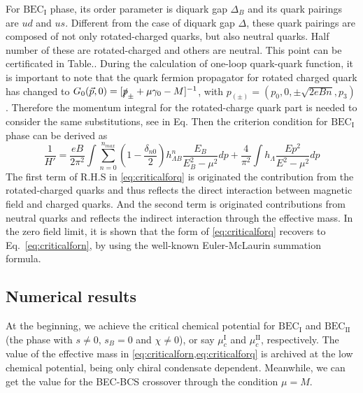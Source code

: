 \documentclass[prd, showpacs,nofootinbib,amsmath,amssymb]{revtex4}
\begin{document}
For  $\text{BEC}_\text{I}$ phase, its order parameter is diquark gap $\Delta_B$ and its quark pairings are
$ud$ and $us$.
Different from the case of diquark gap $\Delta$, these quark pairings are composed of not only rotated-charged  quarks, but also neutral quarks.
Half number of these are rotated-charged  and others are neutral.
This point can be certificated in Table..
During the calculation of  one-loop quark-quark function, it is important to
note  that the  quark fermion propagator for rotated charged quark has changed to
$G_0(\vec{p},0) = [\slashed{p}_{\pm}+\mu\gamma_0 - M]^{-1}$, with $p_{(\pm )} = (p_0,0,\pm\sqrt{2eBn},p_3)$.
%
 Therefore the momentum integral for the rotated-charge quark part is needed to consider the same substitutions, see in Eq.
Then the  criterion condition for $\text{BEC}_\text{I}$ phase can be derived as
\begin{equation}
\label{eq:criticalforq}
\frac{1}{H'}  =
 \frac{eB}{2\pi^2} \int \sum_{n=0}^{n_{max}} (1 -\frac{\delta_{n0}}{2}) h_{\Lambda B}^n
\frac{E_B}{E_B^2 -\mu^2 } dp + \frac{4}{ \pi^2} \int  h_{\Lambda}
\frac{Ep^2 }{E^2 - \mu^2} dp
\end{equation}
The  first term of R.H.S in  \cref{eq:criticalforq} is
originated the contribution from the rotated-charged quarks and thus reflects the direct interaction between magnetic field and charged quarks. And the second term
is originated contributions from neutral quarks and reflects the indirect interaction through the effective mass.
In the zero field limit, it is  shown that the form of \cref{eq:criticalforq}  recovers to Eq.~\eqref{eq:criticalforn}, by using the well-known Euler-McLaurin summation formula.
\subsection{Numerical results}
At the beginning, we achieve the critical chemical potential for $\text{BEC}_\text{I}$ and $\text{BEC}_\text{II}$ (the phase with $s\neq 0$, $s_B=0$ and $\chi  \neq 0$), or say $\mu_c^\text{I}$ and $\mu_c^\text{II}$,  respectively.
The value of the effective mass in \cref{eq:criticalforn,eq:criticalforq} is archived at the low chemical potential, being only chiral condensate dependent.
Meanwhile, we can get the value for the BEC-BCS crossover through the condition $\mu = M$.
\end{document}
